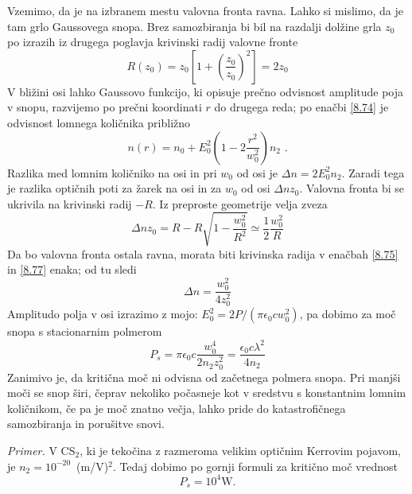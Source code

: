 \documentclass[11pt,fleqn]{book} %
\begin{document}
Vzemimo, da je na izbranem mestu valovna fronta ravna. Lahko si mislimo,
da je tam grlo Gaussovega snopa. Brez samozbiranja bi bil na razdalji
dolžine grla $z_{0}$ po izrazih iz drugega poglavja krivinski radij
valovne fronte 
\begin{equation}
R(z_{0})=z_{0}[1+\left(\frac{z_{0}}{z_{0}}\right)^{2}]=2z_{0}\label{8.75}
\end{equation}
 V bližini osi lahko Gaussovo funkcijo, ki opisuje prečno odvisnost
amplitude poja v snopu, razvijemo po prečni koordinati $r$ do drugega
reda; po enačbi \ref{8.74} je odvisnost lomnega količnika približno
\begin{equation}
n(r)=n_{0}+E_{0}^{2}(1-2\frac{r^{2}}{w_{0}^{2}})n_{2}\text{ .}\label{8.76}
\end{equation}
 Razlika med lomnim količniko na osi in pri $w_{0}$ od osi je $\Delta n=2E_{0}^{2}n_{2}$.
Zaradi tega je razlika optičnih poti za žarek na osi in za $w_{0}$
od osi $\Delta nz_{0}$. Valovna fronta bi se ukrivila na krivinski
radij $-R$. Iz preproste geometrije velja zveza 
\begin{equation}
\Delta nz_{0}=R-R\sqrt{1-\frac{w_{0}^{2}}{R^{2}}}\simeq\frac{1}{2}\frac{w_{0}^{2}}{R}\label{8.77}
\end{equation}
 Da bo valovna fronta ostala ravna, morata biti krivinska radija v
enačbah \ref{8.75} in \ref{8.77} enaka; od tu sledi 
\begin{equation}
\Delta n=\frac{w_{0}^{2}}{4z_{0}^{2}}\label{8.78}
\end{equation}
 Amplitudo polja v osi izrazimo z mo\textquotedbl{}jo: $E_{0}^{2}=2P/(\pi\epsilon_{0}cw_{0}^{2})$,
pa dobimo za moč snopa s stacionarnim polmerom 
\begin{equation}
P_{s}=\pi\epsilon_{0}c\frac{w_{0}^{4}}{2n_{2}z_{0}^{2}}=\frac{\epsilon_{0}c\lambda^{2}}{4n_{2}}\label{8.79}
\end{equation}
 Zanimivo je, da kritična moč ni odvisna od začetnega polmera snopa.
Pri manjši moči se snop širi, čeprav nekoliko počasneje kot v sredstvu
s konstantnim lomnim količnikom, če pa je moč znatno večja, lahko
pride do katastrofičnega samozbiranja in porušitve snovi.

\textit{Primer. }V CS$_{2}$, ki je tekočina z razmeroma velikim optičnim
Kerrovim pojavom, je $n_{2}=10^{-20}$~(m/V)$^{2}$. Tedaj dobimo
po gornji formuli za kritično moč vrednost 
\[
P_{s}=10^{4}\text{W.}
\]
\end{document}
